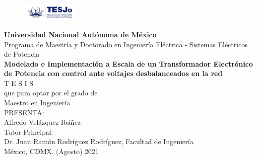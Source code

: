 \thispagestyle{empty}  %

\begin{titlepage}
    \setlength{\parindent}{0pt} 
    \setlength{\parskip}{0pt}

    \begin{center}
        \vfill 

        \begin{figure}
            \centering
            \includegraphics[width=0.25\textwidth]{Imagenes/logo tesjo.png}
        \end{figure}

        \vspace{0.5cm}

        {\Huge \textbf{Universidad Nacional Aut\'onoma de M\'exico}}\\[1cm]

        {\large Programa de Maestr\'ia y Doctorado en Ingenier\'ia Eléctrica - Sistemas El\'ectricos de Potencia}\\[1.5cm]

        {\Large \textbf{Modelado e Implementación a Escala de un Transformador Electrónico de Potencia con control ante voltajes desbalanceados en la red}}\\[1.5cm]

        {\huge T E S I S}\\[0.5cm]
        que para optar por el grado de \\[0.3cm]
        {\large Maestro en Ingeniería}\\[1cm]

        PRESENTA:\\
        {\large Alfredo Velázquez Ibáñez}\\[0.7cm]

        Tutor Principal:\\
        Dr. Juan Ramón Rodríguez Rodríguez, Facultad de Ingeniería\\[1.5cm]

        México, CDMX. (Agosto) 2021

        \vfill
    \end{center}
\end{titlepage}
